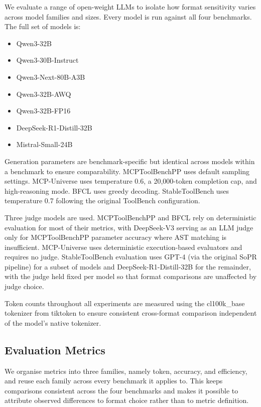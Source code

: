 \documentclass[11pt]{article}
\begin{document}
We evaluate a range of open-weight LLMs to isolate how format sensitivity varies across model families and sizes. Every model is run against all four benchmarks. The full set of models is:

\begin{itemize}
    \item Qwen3-32B
    \item Qwen3-30B-Instruct
    \item Qwen3-Next-80B-A3B
    \item Qwen3-32B-AWQ
    \item Qwen3-32B-FP16
    \item DeepSeek-R1-Distill-32B
    \item Mistral-Small-24B
\end{itemize}

Generation parameters are benchmark-specific but identical across models within a benchmark to ensure comparability. MCPToolBenchPP uses default sampling settings. MCP-Universe uses temperature 0.6, a 20{,}000-token completion cap, and high-reasoning mode. BFCL uses greedy decoding. StableToolBench uses temperature 0.7 following the original ToolBench configuration.

Three judge models are used. MCPToolBenchPP and BFCL rely on deterministic evaluation for most of their metrics, with DeepSeek-V3 \citep{deepseek_v3_2024} serving as an LLM judge only for MCPToolBenchPP parameter accuracy where AST matching is insufficient. MCP-Universe uses deterministic execution-based evaluators and requires no judge. StableToolBench evaluation uses GPT-4 (via the original SoPR pipeline) for a subset of models and DeepSeek-R1-Distill-32B for the remainder, with the judge held fixed per model so that format comparisons are unaffected by judge choice.

Token counts throughout all experiments are measured using the cl100k\_base tokenizer from tiktoken to ensure consistent cross-format comparison independent of the model's native tokenizer.

\subsection{Evaluation Metrics}
\label{sec:metrics}

We organise metrics into three families, namely token, accuracy, and efficiency, and reuse each family across every benchmark it applies to. This keeps comparisons consistent across the four benchmarks and makes it possible to attribute observed differences to format choice rather than to metric definition.
\end{document}
